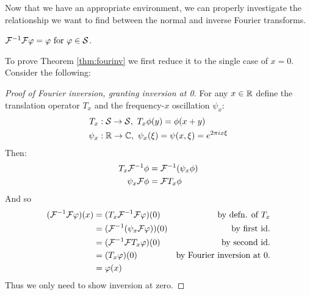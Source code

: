     Now that we have an appropriate environment, we can properly investigate the relationship we want to find between the normal and inverse Fourier transforms.
    \begin{thm}
      \label{thm:fourinv}
      $\mathcal{F}^{-1}\mathcal{F} \varphi = \varphi \text{ for } \varphi\in\mathcal{S}$.
    \end{thm}
    To prove Theorem \ref{thm:fourinv} we first reduce it to the single case of $x=0$.
    Consider the following:
    \begin{proof}[Proof of Fourier inversion, granting inversion at 0]
      For any $x\in\mathbb{R}$ define the translation operator $T_x$ and the frequency-$x$ oscillation $\psi_x$:
      \begin{align*}
        T_x&:\mathcal{S}\rightarrow\mathcal{S},\ T_x\phi(y) = \phi(x+y)\\
        \psi_x&:\mathbb{R}\rightarrow\mathbb{C},\ \psi_x(\xi) = \psi(x,\xi) = e^{2\pi i x \xi}
      \end{align*}
      Then: 
      \begin{align*}
        T_x\mathcal{F}^{-1}\phi &= \mathcal{F}^{-1}(\psi_x\phi)\\
        \psi_x\mathcal{F}\phi &= \mathcal{F} T_x\phi
      \end{align*}
      And so
      \begin{align*}
        (\mathcal{F}^{-1}\mathcal{F}\varphi)(x) &= (T_x\mathcal{F}^{-1}\mathcal{F}\varphi)(0) &\text{by defn. of $T_x$}\\
        &= (\mathcal{F}^{-1}(\psi_x\mathcal{F}\varphi))(0) &\text{by first id.}\\
        &= (\mathcal{F}^{-1}\mathcal{F} T_x\varphi)(0)  &\text{by second id.}\\
        &= (T_x\varphi)(0) &\text{by Fourier inversion at 0.}\\
        &= \varphi(x)&\qedhere
      \end{align*}
    Thus we only need to show inversion at zero.
    \end{proof}

